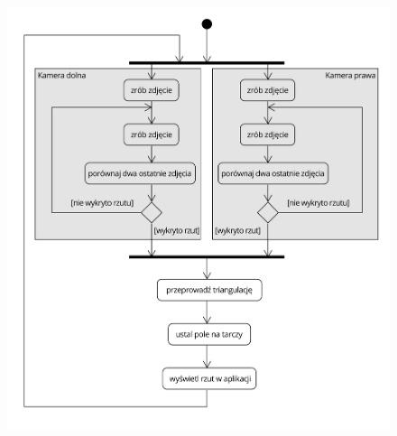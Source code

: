 \begin{figure}[h!]
\begin{center}
\includegraphics[width=\textwidth]{obrazki/activity.pdf}
\end{center}
\label{activity}
\end{figure} 

